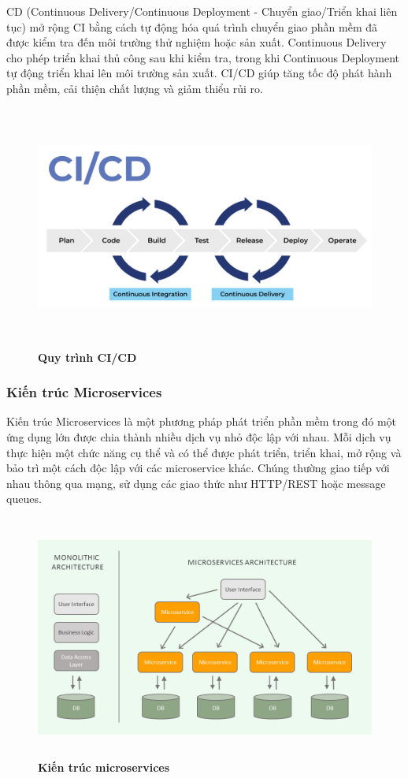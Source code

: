 CD (Continuous Delivery/Continuous Deployment - Chuyển giao/Triển khai liên tục) mở rộng CI bằng cách tự động hóa quá trình chuyển giao phần mềm đã được kiểm tra đến môi trường thử nghiệm hoặc sản xuất. Continuous Delivery cho phép triển khai thủ công sau khi kiểm tra, trong khi Continuous Deployment tự động triển khai lên môi trường sản xuất. CI/CD giúp tăng tốc độ phát hành phần mềm, cải thiện chất lượng và giảm thiểu rủi ro.
\begin{figure}[H]
  \centering
  \includegraphics[width=15cm,height=8cm]{Images/Technology/cicd.png}
  \caption[Quy trình CI/CD]{\bfseries \fontsize{12pt}{0pt}
  \selectfont Quy trình CI/CD}
  \label{cicd} %
\end{figure}

\subsubsection{Kiến trúc Microservices}
Kiến trúc Microservices là một phương pháp phát triển phần mềm trong đó một
ứng dụng lớn được chia thành nhiều dịch vụ nhỏ độc lập với nhau.  Mỗi dịch vụ thực hiện một chức năng cụ thể và có thể được phát triển, triển khai, mở rộng và bảo trì một cách độc lập với các microservice khác. Chúng thường giao tiếp với nhau thông qua mạng, sử dụng các giao thức như HTTP/REST hoặc message queues.

\begin{figure}[H]
  \centering
  \includegraphics[width=15cm,height=8cm]{Images/Technology/microservice.png}
  \caption[Kiến trúc microservices]{\bfseries \fontsize{12pt}{0pt}
  \selectfont Kiến trúc microservices}
  \label{microservice} %
\end{figure}

